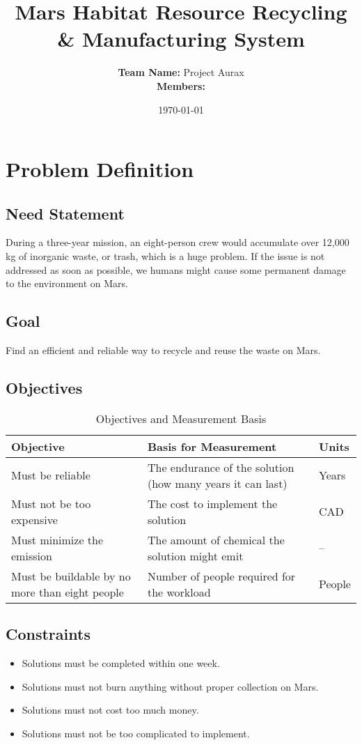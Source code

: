 \documentclass[12pt, a4paper]{article}
\title{\textbf{Mars Habitat Resource Recycling \& Manufacturing System}}
\author{%
    \textbf{Team Name:} Project Aura\textquotesingle x \\[0.3em]
    \textbf{Members:} 
}
\date{\today}
\begin{document}
\maketitle

\section{Problem Definition}

\subsection{Need Statement}
During a three-year mission, an eight-person crew would accumulate over 12,000 kg of inorganic waste, or trash, which is a huge problem. If the issue is not addressed as soon as possible, we humans might cause some permanent damage to the environment on Mars.

\subsection{Goal}
Find an efficient and reliable way to recycle and reuse the waste on Mars.

\subsection{Objectives}

\begin{table}[h!]
\centering
\renewcommand{\arraystretch}{1.3} %
\setlength{\tabcolsep}{8pt} %
\begin{tabular}{p{} p{} p{}}
\toprule
\textbf{Objective} & \textbf{Basis for Measurement} & \textbf{Units} \\ 
\midrule
Must be reliable & The endurance of the solution (how many years it can last) & Years \\[0.3em]
Must not be too expensive & The cost to implement the solution & CAD \\[0.3em]
Must minimize the emission & The amount of chemical the solution might emit & -- \\[0.3em]
Must be buildable by no more than eight people & Number of people required for the workload & People \\
\bottomrule
\end{tabular}
\caption{Objectives and Measurement Basis}
\end{table}

\newpage 
\subsection{Constraints}
\begin{itemize}
    \item Solutions must be completed within one week.
    \item Solutions must not burn anything without proper collection on Mars.
    \item Solutions must not cost too much money.
    \item Solutions must not be too complicated to implement.
\end{itemize}
\end{document}
